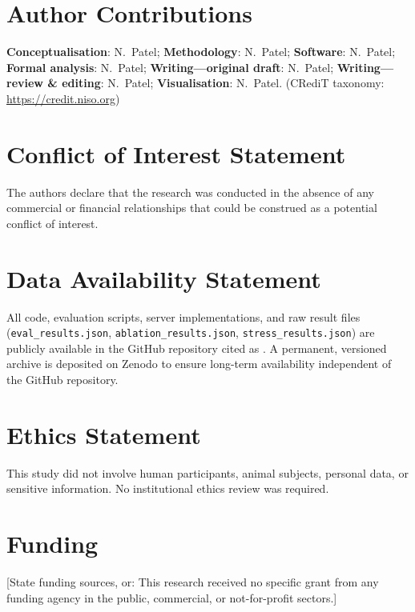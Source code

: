 \documentclass[journal]{IEEEtran}
\begin{document}
\section*{Author Contributions}
\textbf{Conceptualisation}: N.~Patel; \textbf{Methodology}: N.~Patel;
\textbf{Software}: N.~Patel; \textbf{Formal analysis}: N.~Patel;
\textbf{Writing---original draft}: N.~Patel;
\textbf{Writing---review \& editing}: N.~Patel;
\textbf{Visualisation}: N.~Patel.
(CRediT taxonomy: \url{https://credit.niso.org})

\section*{Conflict of Interest Statement}
The authors declare that the research was conducted in the absence of any
commercial or financial relationships that could be construed as a potential
conflict of interest.

\section*{Data Availability Statement}
All code, evaluation scripts, server implementations, and raw result files
(\texttt{eval\_results.json}, \texttt{ablation\_results.json},
\texttt{stress\_results.json}) are publicly available in the GitHub repository
cited as \cite{nac_mcp_impl}. A permanent, versioned archive is deposited on
Zenodo to ensure long-term availability independent of the GitHub repository.

\section*{Ethics Statement}
This study did not involve human participants, animal subjects, personal data,
or sensitive information. No institutional ethics review was required.

\section*{Funding}
[State funding sources, or: This research received no specific grant from any
funding agency in the public, commercial, or not-for-profit sectors.]

\balance
\end{document}
